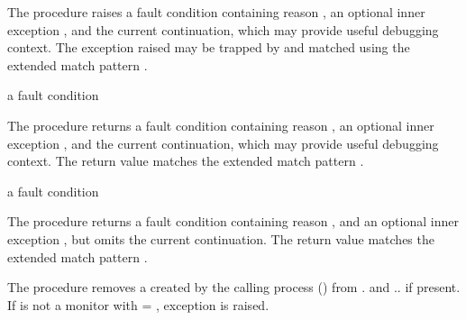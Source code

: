 The  procedure raises a fault condition containing reason
, an optional inner exception , and the current
continuation, which may provide useful debugging context.
The exception raised may be trapped by  and matched using
the extended match pattern .

\begin{procedure}
\end{procedure}
\returns{} a fault condition

The  procedure returns a fault condition containing reason
, an optional inner exception , and the current
continuation, which may provide useful debugging context.
The return value matches
the extended match pattern .

\begin{procedure}
\end{procedure}
\returns{} a fault condition

The  procedure returns a fault condition
containing reason , and an optional inner exception ,
but omits the current continuation.
The return value matches
the extended match pattern .

\begin{procedure}
\end{procedure}
\returns{} 

The  procedure removes a  created by
the calling process () from . and
.. if present.  If
 is not a monitor with  = ,
exception  is raised.

\begin{procedure}
\end{procedure}
\returns{} 

